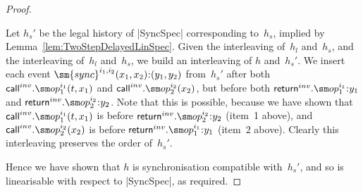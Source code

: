 \begin{proof}
\begin{enumerate}
\end{enumerate}



Let $h_s'$ be the legal history of |SyncSpec| corresponding to~$h_s$, implied
by Lemma~\ref{lem:TwoStepDelayedLinSpec}.  Given the interleaving of~$h_l$
and~$h_s$, and the interleaving of~$h_l$ and~$h_s$, we build an interleaving
of $h$ and~$h_s'$.  We insert each event $\sm{sync}^{i_1,i_2}(x_1,x_2)\::
(y_1,y_2)$ from~$h_s'$ after both $\call^{inv}.\op_1^{i_1}(t,x_1)$ and
$\call^{inv}.\op_2^{i_2}(x_2)$, but before both $\return^{inv}.\op_1^{i_1} \::
y_1$ and $\return^{inv}.\op_2^{i_2} \:: y_2$.  Note that this is possible,
because we have shown that $\call^{inv}.\op_1^{i_1}(t,x_1)$ is before
$\return^{inv}.\op_2^{i_2} \:: y_2$ (item~1 above), and
$\call^{inv}.\op_2^{i_2}(x_2)$ is before $\return^{inv}.\op_1^{i_1} \:: y_1$
(item~2 above).  Clearly this interleaving preserves the order of~$h_s'$.

Hence we have shown that $h$ is synchronisation compatible with~$h_s'$, and so
is linearisable with respect to |SyncSpec|, as required.



\end{proof}



